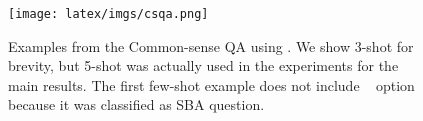 \begin{figure}[th!]
\centering
\texttt{[image: latex/imgs/csqa.png]}
\caption{Examples from the Common-sense QA using \wicd.  We show 3-shot for brevity, but 5-shot was actually used in the experiments for the main results. The first few-shot example does not include \nota~ option because it was classified as SBA question. }
\label{fig:csqa-examples}
\end{figure} 